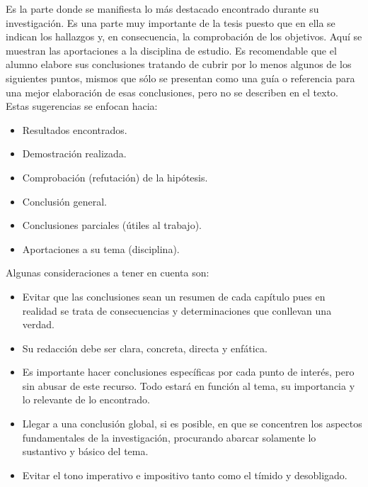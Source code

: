 \documentclass[12]{informe_investigacion}
\begin{document}
\begin{conclusiones}
Es la parte donde se manifiesta lo más destacado encontrado durante su investigación. Es una parte muy importante de la tesis puesto que en ella se indican los hallazgos y, en consecuencia, la comprobación de los objetivos. Aquí se muestran las aportaciones a la disciplina de estudio.
Es recomendable que el alumno elabore sus conclusiones tratando de cubrir por lo menos algunos de los siguientes puntos, mismos que sólo se presentan como una guía o referencia para una mejor elaboración de esas conclusiones, pero no se describen en el texto. Estas sugerencias se enfocan hacia:
\begin{itemize}
    \item Resultados encontrados.
    \item Demostración realizada.
    \item Comprobación (refutación) de la hipótesis.
    \item Conclusión general.
    \item Conclusiones parciales (útiles al trabajo).
    \item Aportaciones a su tema (disciplina).
\end{itemize}

Algunas consideraciones a tener en cuenta son:
\begin{itemize}
    \item Evitar que las conclusiones sean un resumen de cada capítulo pues en realidad se trata de consecuencias y determinaciones que conllevan una verdad.
    \item Su redacción debe ser clara, concreta, directa y enfática.
    \item Es importante hacer conclusiones específicas por cada punto de interés, pero sin abusar de este recurso. Todo estará en función al tema, su importancia y lo relevante de lo encontrado.
    \item Llegar a una conclusión global, si es posible, en que se concentren los aspectos fundamentales de la investigación, procurando abarcar solamente lo sustantivo y básico del tema.
    \item Evitar el tono imperativo e impositivo tanto como el tímido y desobligado.
\end{itemize}

\cite{einstein}

\end{conclusiones}



\end{document}
